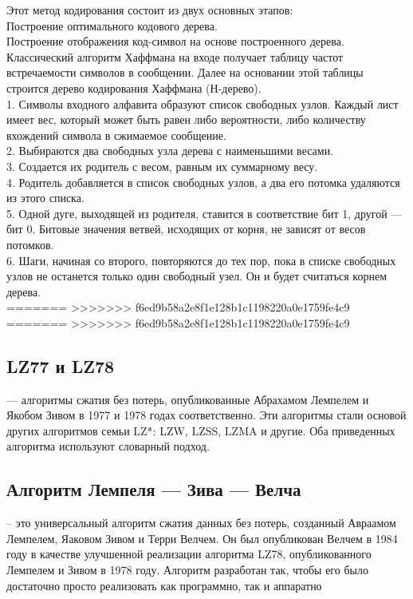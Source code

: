 \documentclass[a4paper, 12pt]{article}
\begin{document}
Этот метод кодирования состоит из двух основных этапов:\\
    Построение оптимального кодового дерева.\\
    Построение отображения код-символ на основе построенного дерева.\\

Классический алгоритм Хаффмана на входе получает таблицу частот встречаемости символов в сообщении. Далее на основании этой таблицы строится дерево кодирования Хаффмана (Н-дерево).\\

    1. Символы входного алфавита образуют список свободных узлов. Каждый лист имеет вес, который может быть равен либо вероятности, либо количеству вхождений символа в сжимаемое сообщение.\\
    2. Выбираются два свободных узла дерева с наименьшими весами.\\
    3. Создается их родитель с весом, равным их суммарному весу.\\
    4. Родитель добавляется в список свободных узлов, а два его потомка удаляются из этого списка.\\
    5. Одной дуге, выходящей из родителя, ставится в соответствие бит 1, другой — бит 0. Битовые значения ветвей, исходящих от корня, не зависят от весов потомков.\\
    6. Шаги, начиная со второго, повторяются до тех пор, пока в списке свободных узлов не останется только один свободный узел. Он и будет считаться корнем дерева.\\
=======
>>>>>>> f6ed9b58a2e8f1e128b1c1198220a0e1759fe4c9
=======
>>>>>>> f6ed9b58a2e8f1e128b1c1198220a0e1759fe4c9


\subsection*{LZ77 и LZ78}
 — алгоритмы сжатия без потерь, опубликованные Абрахамом Лемпелем и Якобом Зивом в 1977 и 1978 годах соответственно. Эти алгоритмы стали основой других алгоритмов семьи LZ*: LZW, LZSS, LZMA и другие. Оба приведенных алгоритма используют словарный подход.\\

\subsection*{Алгоритм Лемпеля — Зива — Велча}
-- это универсальный алгоритм сжатия данных без потерь, созданный Авраамом Лемпелем, Яаковом Зивом и Терри Велчем. Он был опубликован Велчем в 1984 году в качестве улучшенной реализации алгоритма LZ78, опубликованного Лемпелем и Зивом в 1978 году. Алгоритм разработан так, чтобы его было достаточно просто реализовать как программно, так и аппаратно\\
\end{document}
